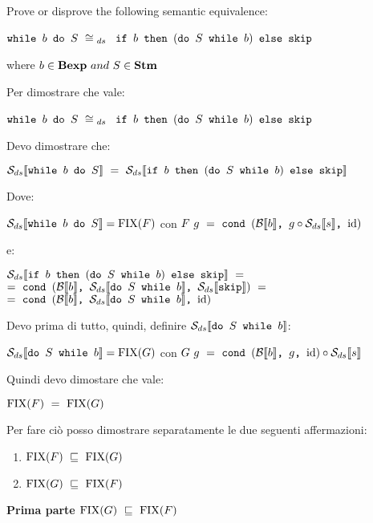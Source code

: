 \newcommand{\dSwb}[2]
{
    \mbox{\normalfont{\texttt{do }}}
    #1
    \textrm{\normalfont{\texttt{ while }}}
    #2
}
\newcommand{\exTen}
{
	$ \wbS{b}{S} ~\cong{}_{ds}~$
	{$\ifABC{b}{(\dSwb{S}{b})}{\skipistr}$}
}
\newcommand{\Sds}{\dsCtxt{s}}
\newcommand{\mineq}{\sqsubseteq}

{
	Prove or disprove the following semantic equivalence:
	\begin{center}
		\exTen{}
	\end{center}
	where $b\in\mbox{\textbf{Bexp}}~and~S\in\mbox{\textbf{Stm}}$
}
{
    Per dimostrare che vale:
    \begin{center}
    \exTen{}
    \end{center}
    Devo dimostrare che:
    \begin{center}
    $\dsCtxt{\wbS{b}{S}}~=~
    \dsCtxt{\ifABC{b}{(\dSwb{S}{b})}{\skipistr}}$
    \end{center}
    Dove:
    \begin{center}
    $\mathcal{S}_{ds}\llbracket \mbox{\normalfont{\texttt{while }}} b \textrm{\normalfont{\texttt{ do }}} S \rrbracket=\textrm{\normalfont{FIX}}(F)$ con 
    $F~g~=~\cond{b}{g \circ{} \Sds{}}{\idDS}$ \\
    \end{center}
    e:
    \begin{center}
    $\dsCtxt{\ifABC{b}{(\dSwb{S}{b})}{\skipistr}}~=$\\$=~
    \cond{b}{\dsCtxt{\dSwb{S}{b}}}{\dsCtxt{\skipistr}}~=$\\$=~
    \cond{b}{\dsCtxt{\dSwb{S}{b}}}{\idDS}$
    \end{center}
    Devo prima di tutto, quindi, definire $\dsCtxt{\dSwb{S}{b}}$:
    \begin{center}
    $\dsCtxt{\dSwb{S}{b}}=\fixp{G}$ con 
    $G~g~=~\cond{b}{g}{\idDS} \circ \Sds$
    \end{center}
    Quindi devo dimostare che vale:
    \begin{center}
    $\textrm{\normalfont{FIX}}(F)~=~\textrm{\normalfont{FIX}}(G)$
    \end{center}
    Per fare ciò posso dimostrare separatamente le due seguenti affermazioni:
    \begin{enumerate}
    \item $\fixp{F}~\mineq~\fixp{G}$
    \item $\fixp{G}~\mineq~\fixp{F}$
    \end{enumerate}

    \textbf{Prima parte $\fixp{G}~\mineq~\fixp{F}$}\\
}
\newpage